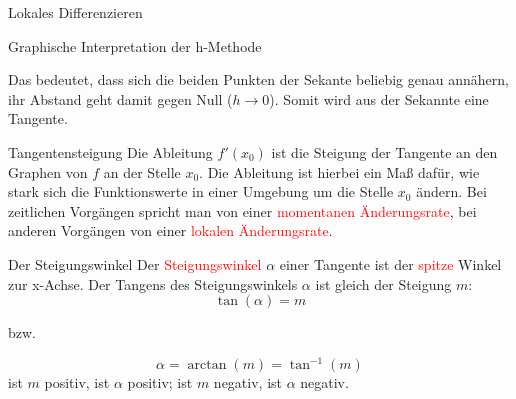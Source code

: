 \begin{section}{Lokales Differenzieren}
\begin{bsp}{Graphische Interpretation der h-Methode}{}
\begin{center}
\end{center}
 Das bedeutet, dass sich die beiden Punkten der Sekante beliebig genau annähern, ihr Abstand geht damit gegen Null ($h\rightarrow 0$). Somit wird aus der Sekannte eine Tangente.
\end{bsp}
\begin{bem*}{Tangentensteigung}{}
   Die Ableitung $f'(x_0)$ ist die Steigung der Tangente an den Graphen von $f$ an der Stelle $x_0$. Die Ableitung ist hierbei ein Maß dafür, wie stark sich die Funktionswerte in einer Umgebung um die Stelle $x_0$ ändern. Bei zeitlichen  Vorgängen spricht man von einer \textcolor{red}{momentanen Änderungsrate}, bei anderen Vorgängen von einer \textcolor{red}{lokalen Änderungsrate}.
\end{bem*}
\begin{bem*}{Der Steigungswinkel}{}
Der \textcolor{red}{Steigungswinkel} $\alpha$ einer Tangente ist der \textcolor{red}{spitze} Winkel zur x-Achse. Der Tangens des Steigungswinkels $\alpha$ ist gleich der Steigung $m$:$$\tan{(\alpha)} = m$$ \begin{center}
    bzw.
\end{center} $$\alpha = \arctan{(m)} = \tan^{-1}{(m)}$$
ist $m$ positiv, ist $\alpha$ positiv; ist $m$ negativ, ist $\alpha$ negativ. 
\begin{center}
\end{center}
\end{bem*}
\end{section}
